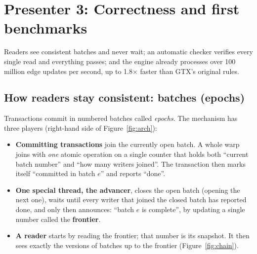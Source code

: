 \documentclass[11pt,a4paper]{article}
\begin{document}
\newpage
\section{Presenter 3: Correctness and first benchmarks}
\label{sec:p3}

\begin{oneline}
Readers see consistent batches and never wait; an automatic checker verifies every single read and everything passes;
and the engine already processes over 100 million edge updates per second, up to 1.8$\times$ faster than GTX's
original rules.
\end{oneline}

\subsection{How readers stay consistent: batches (epochs)}
Transactions commit in numbered batches called \emph{epochs}. The mechanism has three players (right-hand side of
Figure~\ref{fig:arch}):
\begin{itemize}
\item \textbf{Committing transactions} join the currently open batch. A whole warp joins with \emph{one} atomic
  operation on a single counter that holds both ``current batch number'' and ``how many writers joined''. The
  transaction then marks itself ``committed in batch $e$'' and reports ``done''.
\item \textbf{One special thread, the advancer}, closes the open batch (opening the next one), waits until every writer
  that joined the closed batch has reported done, and only then announces: ``batch $e$ is complete'', by updating a
  single number called the \textbf{frontier}.
\item \textbf{A reader} starts by reading the frontier; that number is its snapshot. It then sees exactly the versions
  of batches up to the frontier (Figure~\ref{fig:chain}).
\end{itemize}
\end{document}
